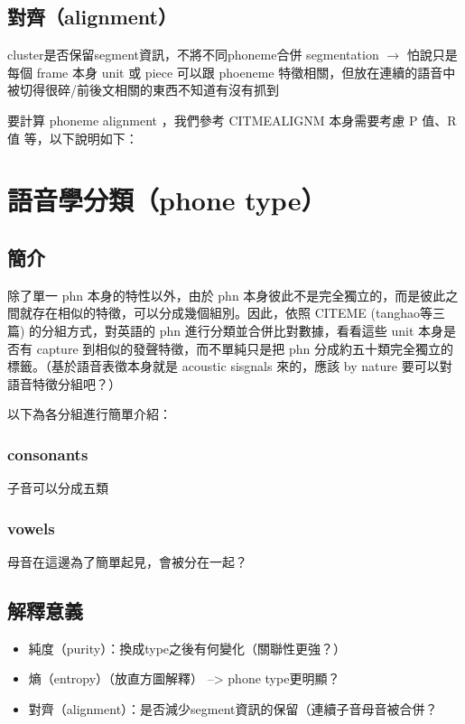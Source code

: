 \subsection{對齊（alignment）}
cluster是否保留segment資訊，不將不同phoneme合併
segmentation $\rightarrow$
怕說只是每個 frame 本身 unit 或 piece 可以跟 phoeneme 特徵相關，但放在連續的語音中被切得很碎/前後文相關的東西不知道有沒有抓到

要計算 phoneme alignment ，我們參考 CITMEALIGNM 本身需要考慮 P 值、R 值 等，以下說明如下：



\section{語音學分類（phone type）}

\subsection{簡介}

除了單一 phn 本身的特性以外，由於 phn 本身彼此不是完全獨立的，而是彼此之間就存在相似的特徵，可以分成幾個組別。因此，依照 CITEME (tanghao等三篇) 的分組方式，對英語的 phn 進行分類並合併比對數據，看看這些 unit 本身是否有 capture 到相似的發聲特徵，而不單純只是把 phn 分成約五十類完全獨立的標籤。（基於語音表徵本身就是 acoustic sisgnals 來的，應該 by nature 要可以對語音特徵分組吧？）

以下為各分組進行簡單介紹：

\subsubsection{consonants}

子音可以分成五類

\subsubsection{vowels}

母音在這邊為了簡單起見，會被分在一起？

\subsection{解釋意義}

\begin{itemize}
    \item 純度（purity）：換成type之後有何變化（關聯性更強？）
    \item 熵（entropy）（放直方圖解釋） --> phone type更明顯？
    \item 對齊（alignment）：是否減少segment資訊的保留（連續子音母音被合併？
\end{itemize}

